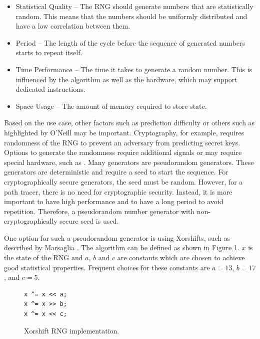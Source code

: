 \begin{itemize}
  \item{Statistical Quality} – The \gls{RNG} should generate numbers that are statistically random. This means that the numbers should be uniformly distributed and have a low correlation between them.
  \item{Period} – The length of the cycle before the sequence of generated numbers starts to repeat itself.
  \item{Time Performance} – The time it takes to generate a random number. This is influenced by the algorithm as well as the hardware, which may support dedicated instructions.
  \item{Space Usage} – The amount of memory required to store state.
\end{itemize}

Based on the use case, other factors such as prediction difficulty or others such as highlighted by O’Neill \cite{o2014pcg} may be important. Cryptography, for example, requires randomness of the \gls{RNG} to prevent an adversary from predicting secret keys. Options to generate the randomness require additional signals \cite{randomnessCryptography} or may require special hardware, such as  \cite{cloudflareLavaRand}. Many generators are pseudorandom generators. These generators are deterministic and require a seed to start the sequence. For cryptographically secure generators, the seed must be random.
However, for a path tracer, there is no need for cryptographic security. Instead, it is more important to have high performance and to have a long period to avoid repetition. Therefore, a pseudorandom number generator with non-cryptographically secure seed is used.

One option for such a pseudorandom generator is using Xorshifts, such as described by Marsaglia \cite{marsaglia2003xorshift}. The algorithm can be defined as shown in Figure \ref{code:xorShift}. $x$ is the state of the \gls{RNG} and $a$, $b$ and $c$ are constants which are chosen to achieve good statistical properties. Frequent choices for these constants are $a = 13$, $b = 17$, and $c = 5$.

\begin{figure}[H]
  \begin{lstlisting}[style=wgsl]
x ^= x << a;
x ^= x >> b;
x ^= x << c;
\end{lstlisting}
  \caption{Xorshift \gls{RNG} implementation.}
  \label{code:xorShift}
\end{figure}

